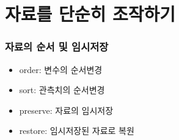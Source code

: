 \documentclass[aspectratio=169,xcolor=dvipsnames,handout]{beamer}
\begin{document}
\section{자료를 단순히 조작하기}
\begin{frame}
    \frametitle{자료의 순서 및 임시저장}
    \begin{itemize}[<+->]
        \item order: 변수의 순서변경
        \item sort: 관측치의 순서변경
        \item preserve: 자료의 임시저장
        \item restore: 임시저장된 자료로 복원
    \end{itemize}
\end{frame}


\end{document}
